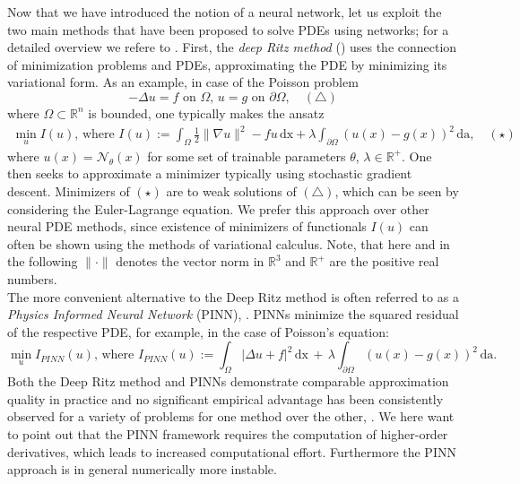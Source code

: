 \documentclass[12pt,openany]{book}
\newcommand{\R}{\mathbb{R}}
\theoremstyle{plainnormal}
\newtheorem{theorem}{Theorem}[section]
\theoremstyle{remark}
\begin{document}
Now that we have introduced the notion of a neural network, let us exploit the two main methods that have been proposed to solve PDEs using networks; for a detailed overview we refere to \cite{E_2021}. First, the \emph{deep Ritz method} (\cite{deepritzmethoddeep}) uses the connection of minimization problems and PDEs, approximating the PDE by minimizing its variational form. As an example, in case of the Poisson problem $$-\Delta u = f \text{ on } \Omega,\, u = g \text{ on } \partial \Omega, \quad (\triangle)
$$ where $\Omega \subset \R^n $ is bounded, one typically makes the ansatz \begin{align*}
    \min_u I(u)\text{, where } I(u) := \int_\Omega \frac{1}{2} \|\nabla u\|^2 - fu \,\mathrm{dx} + \lambda\int_{\partial \Omega} (u(x)- g(x))^2\, \mathrm{da},\quad(\star)
\end{align*}
where $u(x) = \mathcal N_\theta(x)$ for some set of trainable parameters $\theta$, $\lambda\in \R^+$. One then seeks to approximate a minimizer typically using stochastic gradient descent. Minimizers of $(\star)$ are to weak solutions of $(\triangle)$, which can be seen by considering the Euler-Lagrange equation. We prefer this approach over other neural PDE methods, since existence of minimizers of functionals $I(u)$ can often be shown using the methods of variational calculus. Note, that here and in the following $\|\cdot\|$ denotes the vector norm in $\R^3$ and $\R^+$ are the positive real numbers.\\
The more convenient alternative to the Deep Ritz method is often referred to as a \emph{Physics Informed Neural Network} (PINN), \cite{RAISSI2019686}. PINNs minimize the squared residual of the respective PDE, for example, in the case of Poisson's equation:
$$ \min_u I_{PINN}(u)\text{, where } I_{PINN}(u) := \int_\Omega |\Delta u + f|^2 \,\mathrm{dx}\, +\, \lambda \int_{\partial\Omega}(u(x) - g(x))^2 \, \mathrm{da}  .$$
Both the Deep Ritz method and PINNs demonstrate comparable approximation quality in practice and no significant empirical advantage has been consistently observed for a variety of problems for one method over the other, \cite{yang2025numericalstudyhyperparameter}. %
We here want to point out that the PINN framework requires the computation of higher-order derivatives, which leads to increased computational effort. Furthermore the PINN approach is in general numerically more instable.
\end{document}
